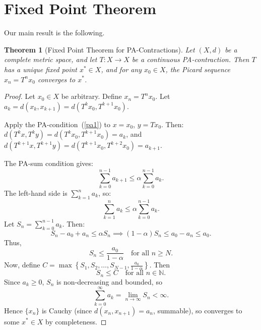 \documentclass[11pt]{article}
\newtheorem{theorem}{Theorem}
\begin{document}
\section{Fixed Point Theorem}

Our main result is the following.

\begin{theorem}[Fixed Point Theorem for PA-Contractions]
Let $ (X,d) $ be a complete metric space, and let $ T: X \to X $ be a continuous PA-contraction. Then $ T $ has a unique fixed point $ x^* \in X $, and for any $ x_0 \in X $, the Picard sequence $ x_n = T^n x_0 $ converges to $ x^* $.
\end{theorem}

\begin{proof}
Let $ x_0 \in X $ be arbitrary. Define $ x_n = T^n x_0 $. Let $ a_k = d(x_k, x_{k+1}) = d(T^k x_0, T^{k+1} x_0) $.

Apply the PA-condition~(\ref{pa1}) to $ x = x_0 $, $ y = T x_0 $. Then:
$ d(T^k x, T^k y) = d(T^k x_0, T^{k+1} x_0) = a_k $, and
$ d(T^{k+1}x, T^{k+1}y) = d(T^{k+1} x_0, T^{k+2} x_0) = a_{k+1} $.

The PA-sum condition gives:
\begin{equation}
\sum_{k=0}^{n-1} a_{k+1} \leq \alpha \sum_{k=0}^{n-1} a_k.
\end{equation}
The left-hand side is $ \sum_{k=1}^{n} a_k $, so:
\begin{equation}
\sum_{k=1}^{n} a_k \leq \alpha \sum_{k=0}^{n-1} a_k.
\end{equation}
Let $ S_n = \sum_{k=0}^{n-1} a_k $. Then:
\begin{equation}
S_n - a_0 + a_n \leq \alpha S_n \implies (1 - \alpha) S_n \leq a_0 - a_n \leq a_0.
\end{equation}
Thus,
\begin{equation}
S_n \leq \frac{a_0}{1 - \alpha} \quad \text{for all } n \ge N.
\end{equation}
Now, define $ C = \max\left\{ S_1, S_2, \dots, S_{N-1}, \frac{a_0}{1 - \alpha} \right\} $. Then
\begin{equation}
S_n \leq C \quad \text{for all } n \in \mathbb{N}.
\end{equation}
Since $ a_k \geq 0 $, $ S_n $ is non-decreasing and bounded, so
\begin{equation}
\sum_{k=0}^{\infty} a_k = \lim_{n \to \infty} S_n < \infty.
\end{equation}
Hence $ \{x_n\} $ is Cauchy (since $ d(x_n, x_{n+1}) = a_n $, summable), so converges to some $ x^* \in X $ by completeness.




\end{proof}
\end{document}
